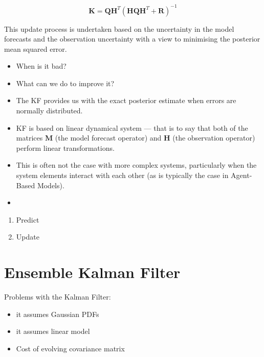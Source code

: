 \begin{equation}
    \mathbf{K} = \mathbf{Q} \mathbf{H}^T \left(
                    \mathbf{H} \mathbf{Q} \mathbf{H}^T + \mathbf{R}
                 \right) ^ {-1}
\end{equation}

This update process is undertaken based on the uncertainty in the model
forecasts and the observation uncertainty with a view to minimising the
posterior mean squared error.

\begin{itemize}
    \item When is it bad?
    \item What can we do to improve it?
    \item The KF provides us with the exact posterior estimate when errors are
        normally distributed.
    \item KF is based on linear dynamical system --- that is to say that both of
        the matrices $\mathbf{M}$ (the model forecast operator) and $\mathbf{H}$
        (the observation operator) perform linear transformations.
    \item This is often not the case with more complex systems, particularly
        when the system elements interact with each other (as is typically the
        case in Agent-Based Models).
    \item 
\end{itemize}

\begin{enumerate}
    \item Predict
    \item Update
\end{enumerate}

\section{Ensemble Kalman Filter}\label{sec:method:enkf}

Problems with the Kalman Filter:
\begin{itemize}
    \item it assumes Gaussian PDFs
    \item it assumes linear model
    \item Cost of evolving covariance matrix
\end{itemize}

